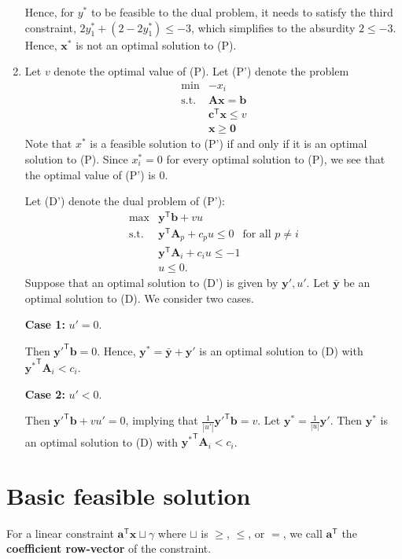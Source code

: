 \documentclass[]{book}
\def\lt{<}
\newcommand{\T}{\mathsf{T}}
\newcommand{\mm}[1]{\mathbf{#1}}
\renewcommand{\vec}[1]{\mathbf{#1}}
\theoremstyle{definition}
\theoremstyle{definition}
\theoremstyle{remark}
\begin{document}
\begin{enumerate}
  Hence, for \(y^*\) to be feasible to the dual problem, it needs to
  satisfy the third constraint, \(2y_1^* + (2 - 2y_1^*) \leq -3\), which
  simplifies to the absurdity \(2 \leq -3\). Hence, \(\vec{x}^*\) is not
  an optimal solution to (P).
\item
  Let \(v\) denote the optimal value of (P). Let (P') denote the problem
  \[\begin{array}{rl}
  \min & -x_i \\
  \text{s.t.} & \mm{A}\vec{x} = \vec{b} \\
  & \vec{c}^\T \vec{x} \leq v \\
  & \vec{x} \geq \vec{0}
  \end{array}\] Note that \(x^*\) is a feasible solution to (P') if and
  only if it is an optimal solution to (P). Since \(x_i^* = 0\) for
  every optimal solution to (P), we see that the optimal value of (P')
  is 0.

  Let (D') denote the dual problem of (P'): \[\begin{array}{rl}
  \max & \vec{y}^\T \vec{b} + v u \\
  \text{s.t.} &
  \vec{y}^\T \mm{A}_p + c_p u \leq 0~~\text{ for all } p \neq i \\
  & \vec{y}^\mathsf{T} \mm{A}_i + c_i u \leq -1 \\
  & u \leq 0.
  \end{array}
  \] Suppose that an optimal solution to (D') is given by
  \(\vec{y}', u'\). Let \(\bar{\vec{y}}\) be an optimal solution to (D).
  We consider two cases.

  \textbf{Case 1:} \(u' = 0\).

  Then \({\vec{y}'}^\T\vec{b} = 0\). Hence,
  \(\vec{y}^* = \bar{\vec{y}} + \vec{y}'\) is an optimal solution to (D)
  with \({\vec{y}^*}^\T \mm{A}_i \lt c_i\).

  \textbf{Case 2:} \(u' \lt 0\).

  Then \({\vec{y}'}^\T\vec{b} + vu'= 0\), implying that
  \(\frac{1}{|u'|} {\vec{y}'}^\T\vec{b} = v\). Let
  \(\vec{y}^* = \frac{1}{|u|}\vec{y}'\). Then \({\vec{y}^*}\) is an
  optimal solution to (D) with \({\vec{y}^*}^\T \mm{A}_i \lt c_i\).
\end{enumerate}

\chapter{Basic feasible solution}\label{basic-feasible-solution}

For a linear constraint \(\vec{a}^\T \vec{x} \sqcup \gamma\) where
\(\sqcup\) is \(\geq\), \(\leq\), or \(=\), we call \(\vec{a}^\T\) the
\textbf{coefficient row-vector} of the constraint.
\end{document}
